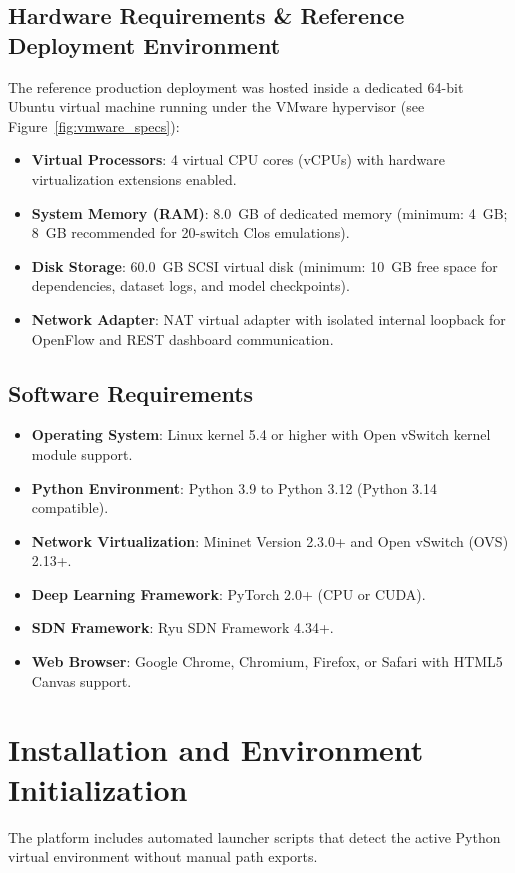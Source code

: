 \documentclass[12pt,a4paper,oneside]{report}
\begin{document}
\subsection{Hardware Requirements \& Reference Deployment Environment}
The reference production deployment was hosted inside a dedicated 64-bit Ubuntu virtual machine running under the VMware hypervisor (see Figure~\ref{fig:vmware_specs}):
\begin{itemize}
    \item \textbf{Virtual Processors}: 4 virtual CPU cores (vCPUs) with hardware virtualization extensions enabled.
    \item \textbf{System Memory (RAM)}: 8.0~GB of dedicated memory (minimum: 4~GB; 8~GB recommended for 20-switch Clos emulations).
    \item \textbf{Disk Storage}: 60.0~GB SCSI virtual disk (minimum: 10~GB free space for dependencies, dataset logs, and model checkpoints).
    \item \textbf{Network Adapter}: NAT virtual adapter with isolated internal loopback for OpenFlow and REST dashboard communication.
\end{itemize}


\subsection{Software Requirements}
\begin{itemize}
    \item \textbf{Operating System}: Linux kernel 5.4 or higher with Open vSwitch kernel module support.
    \item \textbf{Python Environment}: Python 3.9 to Python 3.12 (Python 3.14 compatible).
    \item \textbf{Network Virtualization}: Mininet Version 2.3.0+ and Open vSwitch (OVS) 2.13+.
    \item \textbf{Deep Learning Framework}: PyTorch 2.0+ (CPU or CUDA).
    \item \textbf{SDN Framework}: Ryu SDN Framework 4.34+.
    \item \textbf{Web Browser}: Google Chrome, Chromium, Firefox, or Safari with HTML5 Canvas support.
\end{itemize}

\section{Installation and Environment Initialization}
The platform includes automated launcher scripts that detect the active Python virtual environment without manual path exports.
\end{document}
